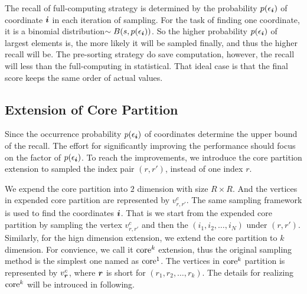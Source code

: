 \documentclass[letterpaper]{article}
\newcommand{\V}[1]{{\bm{{\MakeLowercase{#1}}}}}
\newcommand{\coord}{(i_1,i_2,\ldots,i_N)}
\begin{document}
The recall of full-computing strategy is determined by
the probability $p(\epsilon_{\V{i}})$ of coordinate $\V{i}$ in each iteration of sampling.
For the task of finding one coordinate, it is a binomial distribution$\sim B(s,p(\epsilon_{\V{i}}))$.
So the higher probability $p(\epsilon_{\V{i}})$ of largest elements is,
the more likely it will be sampled finally,
and thus the higher recall will be.
The pre-sorting strategy do save computation,
however, the recall will less than the full-computing in statistical.
That ideal case is that the final score keeps the same order of actual values.

\subsection{Extension of Core Partition}

Since the occurrence probability $p(\epsilon_{\V{i}})$ of coordinates 
determine the upper bound of the recall.
The effort for significantly improving the performance
should focus on the factor of $p(\epsilon_{\V{i}})$.
To reach the improvements,
we introduce the core partition extension to sampled the index pair $(r,r')$,
instead of one index $r$.

We expend the core partition into $2$ dimension with size $R\times R$.
And the vertices in expended core partition are represented by $v^c_{r,r'}$.
The same sampling framework is used to find the coordinates $\V{i}$.
That is we start from the expended core partition by sampling the vertex $v^c_{r,r'}$
and then the $\coord$ under $(r,r')$.
Similarly, for the hign dimension extension,
we extend the core partition to $k$ dimension.
For convience, we call it ${\rm core}^k$ extension,
thus the original sampling method is the simplest one named as ${\rm core}^1$.
The vertices in ${\rm core}^k$ partition is represented by $v^c_{\V{r}}$,
where $\V{r}$ is short for $(r_1,r_2,\ldots,r_k)$.
The details for realizing ${\rm core}^k$ will be introuced in following.
\end{document}
